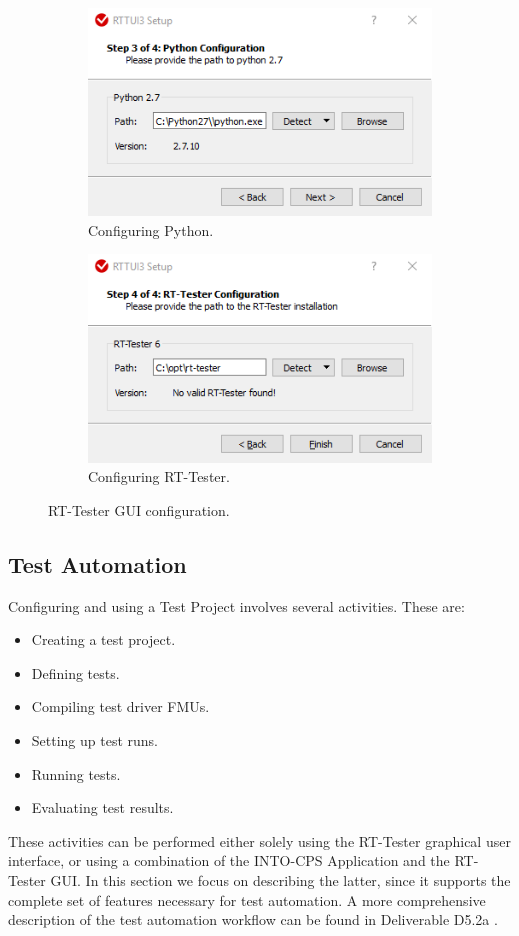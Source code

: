 \begin{figure}[ht]
    \begin{subfigure}{0.5\textwidth}
        \centerline{\includegraphics[scale=0.45]{figures/VSI-Configuration-Python}}
        \caption{Configuring Python.}
        \label{figure:rtt-mbt.config.python}
    \end{subfigure}
    \begin{subfigure}{0.5\textwidth}
        \centerline{\includegraphics[scale=0.45]{figures/VSI-Configuration-Rttester}}
        \caption{Configuring RT-Tester.}
        \label{figure:rtt-mbt.config.rttester}
    \end{subfigure}
    \caption{RT-Tester GUI configuration.}
\end{figure}
%
%
%
\subsection{Test Automation}\label{sec:TestAuto}
Configuring and using a Test Project involves several activities.  These are:
%
%
%
\begin{itemize}
    \item Creating a test project.
    \item Defining tests.
    \item Compiling test driver FMUs.
    \item Setting up test runs.
    \item Running tests.
    \item Evaluating test results.
\end{itemize}
%
%
%
These activities can be performed either solely using the
RT-Tester graphical user interface,
or using a combination of the INTO-CPS Application and the RT-Tester GUI.
In this section we focus on describing the latter, since it supports the complete set of features necessary for test automation.
%
A more comprehensive description of the test automation workflow can
be found in Deliverable D5.2a \cite{INTOCPSD5.2a}.

